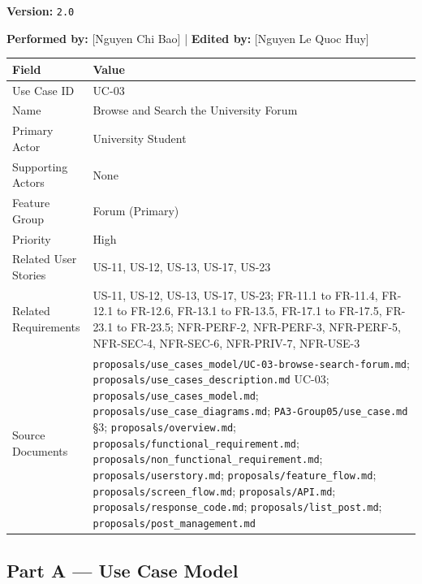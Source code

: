 \documentclass[12pt]{article}
\renewcommand{\baselinestretch}{1.5}
\begin{document}
\textbf{Version:} \texttt{2.0}
\par\medskip

\textbf{Performed by:} [Nguyen Chi Bao] | \textbf{Edited by:} [Nguyen Le Quoc Huy]
\par\medskip

\begingroup
\small
\renewcommand{\baselinestretch}{1.0}\selectfont
\renewcommand{\arraystretch}{1.15}
\setlength{\tabcolsep}{6pt}
\begin{longtable}{|>{\raggedright\arraybackslash}p{}|>{\raggedright\arraybackslash}p{}|}
\hline
\textbf{Field} & \textbf{Value} \\ \hline
\endhead
Use Case ID & UC-03 \\ \hline
Name & Browse and Search the University Forum \\ \hline
Primary Actor & University Student \\ \hline
Supporting Actors & None \\ \hline
Feature Group & Forum (Primary) \\ \hline
Priority & High \\ \hline
Related User Stories & US-11, US-12, US-13, US-17, US-23 \\ \hline
Related Requirements & US-11, US-12, US-13, US-17, US-23; FR-11.1 to FR-11.4, FR-12.1 to FR-12.6, FR-13.1 to FR-13.5, FR-17.1 to FR-17.5, FR-23.1 to FR-23.5; NFR-PERF-2, NFR-PERF-3, NFR-PERF-5, NFR-SEC-4, NFR-SEC-6, NFR-PRIV-7, NFR-USE-3 \\ \hline
Source Documents & \texttt{proposals/use\_cases\_model/UC-03-browse-search-forum.md}; \texttt{proposals/use\_cases\_description.md} UC-03; \texttt{proposals/use\_cases\_model.md}; \texttt{proposals/use\_case\_diagrams.md}; \texttt{PA3-Group05/use\_case.md} §3; \texttt{proposals/overview.md}; \texttt{proposals/functional\_requirement.md}; \texttt{proposals/non\_functional\_requirement.md}; \texttt{proposals/userstory.md}; \texttt{proposals/feature\_flow.md}; \texttt{proposals/screen\_flow.md}; \texttt{proposals/API.md}; \texttt{proposals/response\_code.md}; \texttt{proposals/list\_post.md}; \texttt{proposals/post\_management.md} \\ \hline
\end{longtable}
\endgroup
\par\medskip

\hypertarget{sec:part-a-use-case-model}{}
\subsection*{Part A --- Use Case Model}
\par\medskip
\end{document}
